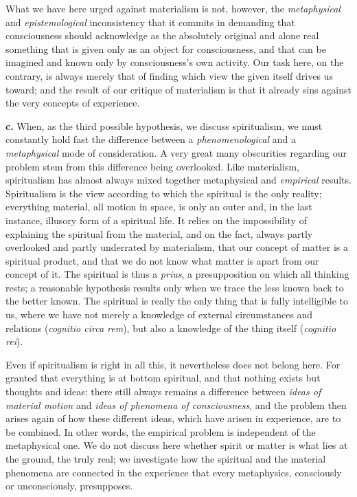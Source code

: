 \documentclass[12pt,a4paper]{book}
\newcommand{\opage}[1]{\marginnote{\footnotesize\textit{[#1]}}}
\begin{document}
What we have here urged against materialism is not, however, the
\emph{metaphysical} and \emph{epistemological} inconsistency that it
commits in demanding that consciousness should acknowledge as the
absolutely original and alone real something that is given only as an
object for consciousness, and that can be imagined and known only by
consciousness's own activity. Our task here, on the contrary, is always
merely that of finding which view the given itself drives us toward;
and the result of our critique of materialism is that it already sins
against the very concepts of experience.

\textbf{c.} When, as the third possible hypothesis, we discuss
spiritualism, we must constantly hold fast the difference between a
\emph{phenomenological} and a \emph{metaphysical} mode of consideration.
A very great many obscurities regarding our problem stem from this
difference being overlooked. Like materialism, spiritualism has almost
always mixed together metaphysical and \emph{empirical} results.
Spiritualism is the view according to which the spiritual is the only
reality; everything material, all motion in space, is only an outer
and, in the last instance, illusory form of a spiritual life. It relies
on the impossibility of explaining the spiritual from the material, and
on the fact, always partly overlooked and partly underrated by
materialism, that our concept of matter is a spiritual product, and that
we do not know what matter is apart from our concept of it. The
spiritual is thus a \textit{prius}, a presupposition on which all
thinking rests; a reasonable hypothesis results only when we trace the
less known back to the better known. The spiritual is really the only
thing that is fully intelligible to us, where we have not merely a
knowledge of external circumstances and relations (\textit{cognitio
circa rem}), but also a knowledge of the thing itself (\textit{cognitio
rei}).

Even if spiritualism is right in all this, it nevertheless does not
belong here. For granted that everything is at bottom spiritual, and
that nothing exists but thoughts and
\opage{75}ideas: there still always remains a difference between
\emph{ideas of material motion} and \emph{ideas of phenomena of
consciousness}, and the problem then arises again of how these
different ideas, which have arisen in experience, are to be combined.
In other words, the empirical problem is independent of the
metaphysical one. We do not discuss here whether spirit or matter is
what lies at the ground, the truly real; we investigate how the
spiritual and the material phenomena are connected in the experience
that every metaphysics, consciously or unconsciously, presupposes.
\end{document}
